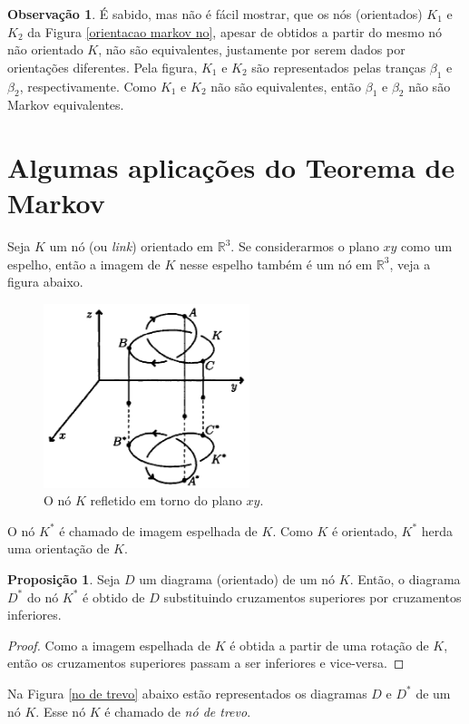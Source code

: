\documentclass[a4paper,portuguese,11pt,twoside, leqno]{book}
\theoremstyle{definition}
\newtheorem{remark}{Observação}[section]
\newtheorem{prop}{Proposição}[section]
\begin{document}
\begin{remark}
		\par\vspace{0.3cm} É sabido, mas não é fácil mostrar, que os nós (orientados) $K_1$ e $K_2$ da Figura \eqref{orientacao markov no}, apesar de obtidos a partir do mesmo nó não orientado $K$, não são equivalentes, justamente por serem dados por orientações diferentes. Pela figura, $K_1$ e $K_2$ são representados pelas tranças $\beta_1$ e $\beta_2$, respectivamente. Como $K_1$ e $K_2$ não são equivalentes, então $\beta_1$ e $\beta_2$ não são Markov equivalentes.  
		
	\end{remark}
	\section{Algumas aplicações do Teorema de Markov}
	\hspace{12pt} Seja $K$ um nó (ou \textit{link}) orientado em $\mathbb{R}^3$. Se considerarmos o plano $xy$ como um espelho, então a imagem de $K$ nesse espelho também é um nó em $\mathbb{R}^3$, veja a figura abaixo.
	
	\begin{figure}[H]
		\begin{center}
			\includegraphics[width=6cm]{Images/no_espelhado.png}
		\end{center}\caption{O nó $K$ refletido em torno do plano $xy$.}\label{no espelhado}
	\end{figure}
	\par\vspace{0.3cm} O nó $K^\ast$ é chamado de imagem espelhada de $K$. Como $K$ é orientado, $K^\ast$ herda uma orientação de $K$.
	\begin{prop}
		\label{troca de cruzamentos}
		Seja $D$ um diagrama (orientado) de um nó $K$. Então, o diagrama $D^\ast$ do nó $K^\ast$ é obtido de $D$ substituindo cruzamentos superiores por cruzamentos inferiores.	
	\end{prop}
	\begin{proof}
		Como a imagem espelhada de $K$ é obtida a partir de uma rotação de $K$, então os cruzamentos superiores passam a ser inferiores e vice-versa.
	\end{proof}
	\par\vspace{0.3cm} Na Figura \eqref{no de trevo} abaixo estão representados os diagramas $D$ e $D^\ast$ de um nó $K$. Esse nó $K$ é chamado de \textit{nó de trevo}.
	
\end{document}
